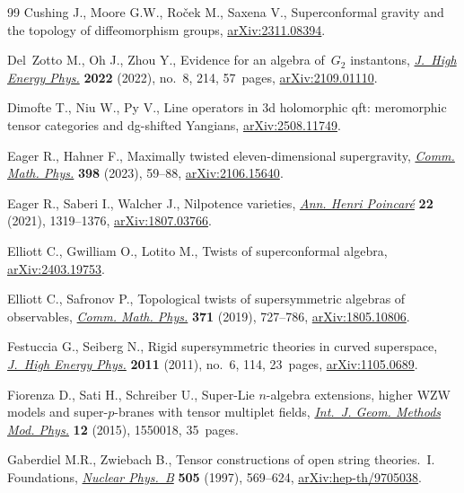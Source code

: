 \begin{thebibliography}{99}
Cushing J., Moore G.W., Ro{\v{c}}ek M., Saxena V., Superconformal gravity and
 the topology of diffeomorphism groups,
 \href{http://arxiv.org/abs/2311.08394}{arXiv:2311.08394}.

Del~Zotto M., Oh J., Zhou Y., Evidence for an algebra of~{$G_2$} instantons,
 \href{https://doi.org/10.1007/jhep08(2022)214}{\textit{J.~High Energy Phys.}}
 \textbf{2022} (2022), no.~8, 214, 57~pages,
 \href{http://arxiv.org/abs/2109.01110}{arXiv:2109.01110}.

Dimofte T., Niu W., Py V., Line operators in 3d holomorphic qft: meromorphic
 tensor categories and dg-shifted {Y}angians,
 \href{http://arxiv.org/abs/2508.11749}{arXiv:2508.11749}.

Eager R., Hahner F., Maximally twisted eleven-dimensional supergravity,
 \href{https://doi.org/10.1007/s00220-022-04516-5}{\textit{Comm. Math. Phys.}}
 \textbf{398} (2023), 59--88,
 \href{http://arxiv.org/abs/2106.15640}{arXiv:2106.15640}.

Eager R., Saberi I., Walcher J., Nilpotence varieties,
 \href{https://doi.org/10.1007/s00023-020-01007-y}{\textit{Ann. Henri
 Poincar\'e}} \textbf{22} (2021), 1319--1376,
 \href{http://arxiv.org/abs/1807.03766}{arXiv:1807.03766}.

Elliott C., Gwilliam O., Lotito M., Twists of superconformal algebra,
 \href{http://arxiv.org/abs/2403.19753}{arXiv:2403.19753}.

Elliott C., Safronov P., Topological twists of supersymmetric algebras of
 observables, \href{https://doi.org/10.1007/s00220-019-03393-9}{\textit{Comm.
 Math. Phys.}} \textbf{371} (2019), 727--786,
 \href{http://arxiv.org/abs/1805.10806}{arXiv:1805.10806}.

Festuccia G., Seiberg N., Rigid supersymmetric theories in curved superspace,
 \href{https://doi.org/10.1007/JHEP06(2011)114}{\textit{J.~High Energy Phys.}}
 \textbf{2011} (2011), no.~6, 114, 23~pages,
 \href{http://arxiv.org/abs/1105.0689}{arXiv:1105.0689}.

Fiorenza D., Sati H., Schreiber U., Super-{L}ie {$n$}-algebra extensions,
 higher {WZW} models and super-{$p$}-branes with tensor multiplet fields,
 \href{https://doi.org/10.1142/S0219887815500188}{\textit{Int.~J. Geom.
 Methods Mod. Phys.}} \textbf{12} (2015), 1550018, 35~pages.

Gaberdiel M.R., Zwiebach B., Tensor constructions of open string theories.~{I}.
 {F}oundations,
 \href{https://doi.org/10.1016/S0550-3213(97)00580-4}{\textit{Nuclear
 Phys.~B}} \textbf{505} (1997), 569--624,
 \href{http://arxiv.org/abs/hep-th/9705038}{arXiv:hep-th/9705038}.


\end{thebibliography}
